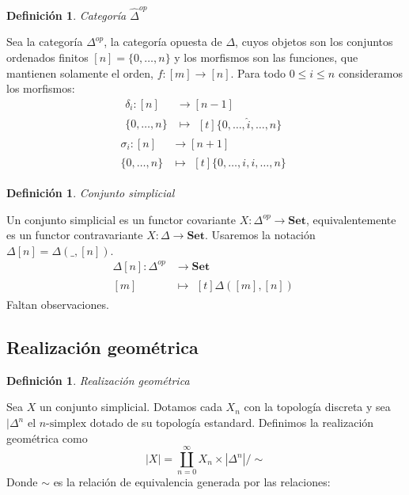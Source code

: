 \documentclass[11pt,a4paper,openright,oneside]{article}
\numberwithin{equation}{section}
\newtheorem{defi}[teo]{Definici\'on}
\theoremstyle{definition}
\begin{document}
\begin{defi}
    Categor\'ia $\hat{\Delta}^{op}$
\end{defi}
Sea la categor\'ia $\Delta^{op}$, la categor\'ia opuesta de $\Delta$, cuyos objetos son los conjuntos ordenados finitos $[n] = \{0,\dots,n\}$ y los morfismos son las funciones, que mantienen solamente el orden, $f: [m] \longrightarrow [n]$.
Para todo $0\le i \le n$ consideramos los morfismos:
\begin{align*}
    \delta_i: [n] & \longrightarrow [n-1] \\
    \{0,\dots,n\} & \longmapsto\!
    \begin{aligned}[t]
        \{0,\dots, \hat{i}, \dots,n\}
    \end{aligned}
\end{align*}
\begin{align*}
    \sigma_i: [n] & \longrightarrow [n+1] \\
    \{0,\dots,n\} & \longmapsto\!
    \begin{aligned}[t]
        \{0,\dots, i,i, \dots,n\}
    \end{aligned}
\end{align*}

\begin{defi}
    Conjunto simplicial
\end{defi}
Un conjunto simplicial es un functor covariante $X: \Delta^{op} \longrightarrow \mathbf{Set}$, equivalentemente es un functor contravariante $X: \Delta \longrightarrow \mathbf{Set}$.
Usaremos la notaci\'on $\Delta[n]=\Delta(\_,[n])$.
\begin{align*}
    \Delta[n]: \Delta^{op} & \longrightarrow \mathbf{Set} \\
    [m]                    & \longmapsto\!
    \begin{aligned}[t]
        \Delta([m],[n])
    \end{aligned}
\end{align*}
Faltan observaciones.

\subsection{Realizaci\'on geom\'etrica}
\begin{defi}
    Realizaci\'on geom\'etrica
\end{defi}
Sea $X$ un conjunto simplicial. Dotamos cada $X_n$ con la topolog\'ia discreta y sea $|\Delta^n$ el $n\text{-simplex}$ dotado de su topolog\'ia estandard. Definimos la realizaci\'on geom\'etrica como
$$
    |X| = \coprod_{n=0}^{\infty}X_n \times |\Delta^n| / \sim
$$
Donde $\sim$ es la relaci\'on de equivalencia generada por las relaciones:
\end{document}
